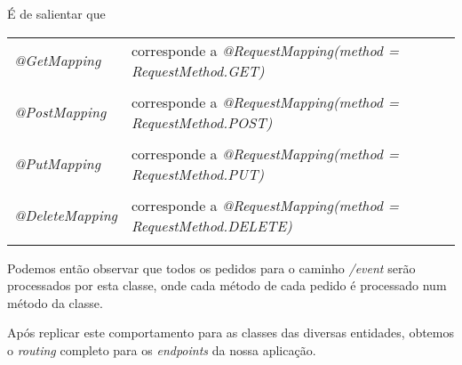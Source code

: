 É de salientar que\\
\begin{tabular}{ll}\\
	\emph{@GetMapping} & corresponde a \emph{@RequestMapping(method = RequestMethod.GET)}\\
	\\
	\emph{@PostMapping} & corresponde a \emph{@RequestMapping(method = RequestMethod.POST)}\\
	\\
	\emph{@PutMapping} & corresponde a \emph{@RequestMapping(method = RequestMethod.PUT)}\\
	\\
	\emph{@DeleteMapping} & corresponde a \emph{@RequestMapping(method = RequestMethod.DELETE)}\\
	\\
\end{tabular}

Podemos então observar que todos os pedidos para o caminho \emph{/event} serão processados por esta classe, onde cada método de cada pedido é processado num método da classe.

Após replicar este comportamento para as classes das diversas entidades, obtemos o \textit{routing} completo para os \emph{endpoints} da nossa aplicação.
